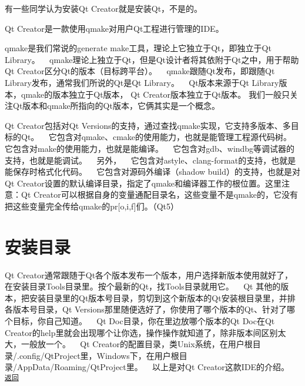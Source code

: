 有一些同学认为安装\+Qt Creator就是安装\+Qt，不是的。

Qt Creator是一款使用qmake对用户\+Qt工程进行管理的\+I\+D\+E。

qmake是我们常说的generate make工具，理论上它独立于\+Qt，即独立于\+Qt Library。 ~\newline
qmake理论上独立于\+Qt，但是\+Qt设计者将其依附于\+Qt之中，用于帮助\+Qt Creator区分\+Qt的版本（目标跨平台）。 ~\newline
qmake跟随\+Qt发布，即跟随\+Qt Library发布，通常我们所说的\+Qt是\+Qt Library。 ~\newline
Qt版本来源于\+Qt Library版本，qmake的版本独立于\+Qt版本， Qt Creator版本独立于\+Qt版本。 我们一般只关注\+Qt版本和qmake所指向的\+Qt版本，它俩其实是一个概念。

Qt Creator包括对\+Qt Versions的支持，通过查找qmake实现，它支持多版本、多目标的\+Qt。 ~\newline
它包含对qmake、cmake的使用能力，也就是能管理工程源代码树。 它包含对make的使用能力，也就是能编译。 ~\newline
它包含对gdb、windbg等调试器的支持，也就是能调试。 ~\newline
另外， ~\newline
它包含对astyle、clang-\/format的支持，也就是能保存时格式化代码。 ~\newline
它包含对源码外编译（shadow build）的支持，也就是对\+Qt Creator设置的默认编译目录，指定了qmake和编译器工作的根位置。这里注意：\+Qt Creator可以根据自身的变量通配目录名，这些变量不是qmake的，它没有把这些变量完全传给qmake的pr\mbox{[}o,i,f\mbox{]}们。（\+Qt5） ~\newline
 \section*{安装目录}

Qt Creator通常跟随于\+Qt各个版本发布一个版本，用户选择新版本使用就好了，在安装目录\+Tools目录里。按个最新的\+Qt，找\+Tools目录就用它。 ~\newline
Qt 其他的版本，把安装目录里的\+Qt版本号目录，剪切到这个新版本的\+Qt安装根目录里，并排各版本号目录，\+Qt Versions那里随便选好了，你使用了哪个版本的\+Qt、针对了哪个目标，你自己知道。 ~\newline
Qt Doc目录，你在里边放哪个版本的\+Qt Doc在\+Qt Creator的help里就会出现哪个让你选，操作操作就知道了，除非版本间区别太大，一般放一个。 ~\newline
Qt Creator的配置目录，类\+Unix系统，在用户根目录/.config/\+Qt\+Project里，\+Windows下，在用户根目录/\+App\+Data/\+Roaming/\+Qt\+Project里。 ~\newline
 以上是对\+Qt Creator这款\+I\+D\+E的介绍。 ~\newline
 \href{.}{\tt 返回} 